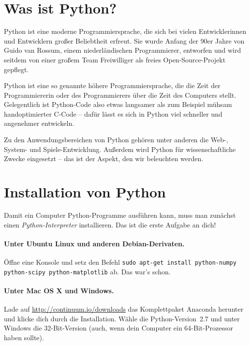 \documentclass{blatt}
\begin{document}

\tableofcontents

\section{Was ist Python?}

Python ist eine moderne Programmiersprache, die sich bei vielen Entwicklerinnen
und Entwicklern großer Beliebtheit erfreut. Sie wurde Anfang der 90er Jahre von
Guido van Rossum, einem niederländischen Programmierer, entworfen und wird seitdem
von einer großem Team Freiwilliger als freies Open-Source-Projekt gepflegt.

Python ist eine so genannte höhere Programmiersprache, die die Zeit der
Programmiererin oder des Programmierers über die Zeit des Computers stellt.
Gelegentlich ist Python-Code also etwas langsamer als zum Beispiel mühsam
handoptimierter C-Code -- dafür lässt es sich in Python viel schneller und
angenehmer entwickeln.

Zu den Anwendungsbereichen von Python gehören unter anderen die Web-, System-
und Spiele-Entwicklung. Außerdem wird Python für wissenschaftliche Zwecke
eingesetzt -- das ist der Aspekt, den wir beleuchten werden.


\section{Installation von Python}

Damit ein Computer Python-Programme ausführen kann, muss man zunächst einen
\emph{Python-Interpreter} installieren. Das ist die erste Aufgabe an dich!

\paragraph{Unter Ubuntu Linux und anderen Debian-Derivaten.}
Öffne eine Konsole und setz den Befehl \texttt{sudo apt-get install
python-numpy python-scipy python-matplotlib} ab. Das war's schon.

\paragraph{Unter Mac OS X und Windows.} Lade auf
\url{http://continuum.io/downloads} das Komplettpaket Anaconda herunter und
klicke dich durch die Installation. Wähle die Python-Version~2.7 und unter
Windows die 32-Bit-Version (auch, wenn dein Computer ein 64-Bit-Prozessor haben
sollte).
\end{document}
